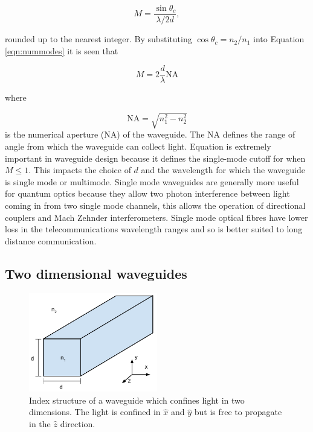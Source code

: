 \begin{equation}\label{eqn:nummodes} M = \frac{\sin \theta_c}{ \lambda / 2d},
\end{equation}

rounded up to the nearest integer. By substituting $\cos \theta_c = n_2/n_1$
into Equation \ref{eqn:nummodes} it is seen that

\begin{equation}\label{eqn:nummodes} M = 2\frac{d}{\lambda} \mathrm{NA}
\end{equation}

where

\begin{equation} \mathrm{NA} = \sqrt{n_1^2-n_2^2} \end{equation} is the
numerical aperture (NA) of the waveguide. The $\mathrm{NA}$ defines the range of
angle from which the waveguide can collect light. Equation \label{eqn:nummodes}
is extremely important in waveguide design because it defines the single-mode
cutoff for when $M \leq 1$. This impacts the choice of $d$ and the wavelength
for which the waveguide is single mode or multimode. Single mode waveguides are
generally more useful for quantum optics because they allow two photon
interference between light coming in from two single mode channels, this allows
the operation of directional couplers and Mach Zehnder interferometers. Single
mode optical fibres have lower loss in the telecommunications wavelength ranges
and so is better suited to long distance communication.

\subsection{Two dimensional waveguides}

\begin{figure}[h!] \begin{center}
\includegraphics[width=0.5\textwidth]{images/2d_waveguide.pdf} \end{center}
\caption{Index structure of a waveguide which confines light in two dimensions.
The light is confined in $\hat{x}$ and $\hat{y}$ but is free to propagate in the
$\hat{z}$ direction.} \label{fig:2dwg} \end{figure}

